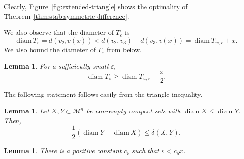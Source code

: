\documentclass[12pt,reqno]{amsart}
\newtheorem{lemma}[theorem]{Lemma}
\theoremstyle{remark}
\newcommand{\M}{\mathcal{M}}
\DeclareMathOperator{\diam}{\mathrm{diam}}
\begin{document}
Clearly, Figure~\ref{fig:extended-triangle} shows the optimality of Theorem~\ref{thm:stab:symmetric-difference}.

We also observe that the diameter of $T_\varepsilon$ is
\[
\diam T_\varepsilon=d(v_2,v(x))<d(v_2,v_3)+d(v_3,v(x))=\diam T_{w,r}+x.
\]
We also bound the diameter of $T_\varepsilon$ from below.

\begin{lemma}\label{lem:diameterbound}
For a sufficiently small $\varepsilon$,
\[
\diam T_\varepsilon\geq\diam T_{w,r}+\frac{x}{2}.
\]
\end{lemma}

The following statement follows easily from the triangle inequality.

\begin{lemma}
Let $X,Y\subset\M^n$ be non-empty compact sets with $\diam X\leq\diam Y$. Then,
\[
\frac{1}{2}(\diam Y-\diam X)\leq\delta(X,Y).
\]
\end{lemma}

\begin{lemma}\label{lem:epsilon-and-x}
There is a positive constant $c_5$ such that $\varepsilon<c_5 x$.
\end{lemma}
\end{document}
